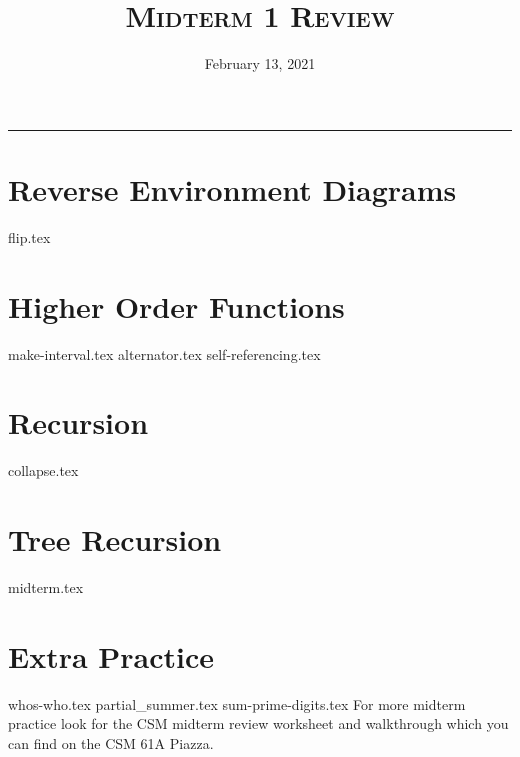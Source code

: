 \documentclass{exam}
\title{\textsc{Midterm 1 Review}}
\date{February 13, 2021}
\begin{document}
\maketitle
\rule{\textwidth}{0.15em}
\fontsize{12}{15}\selectfont



\newpage
\section{Reverse Environment Diagrams}
\begin{questions}
{flip.tex}
\end{questions}

\newpage
\section{Higher Order Functions}
\begin{questions}
{make-interval.tex}
{alternator.tex}
{self-referencing.tex}
\end{questions}

\newpage
\section{Recursion}
\begin{questions}
{collapse.tex}
\end{questions}

\newpage
\section{Tree Recursion}
\begin{questions}
{midterm.tex}
\end{questions}

\newpage
\section{Extra Practice}
\begin{questions}
{whos-who.tex}
{partial_summer.tex}
{sum-prime-digits.tex}
For more midterm practice look for the CSM midterm review worksheet and walkthrough which
you can find on the CSM 61A Piazza. \\
\end{questions}
\end{document}
